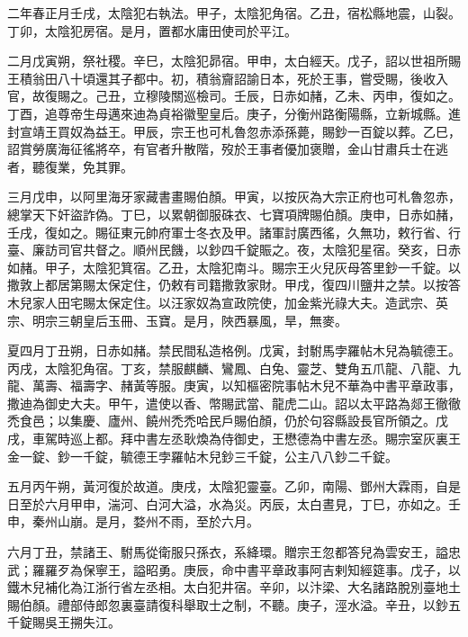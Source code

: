 
\begin{pinyinscope}

 二年春正月壬戌，太陰犯右執法。甲子，太陰犯角宿。乙丑，宿松縣地震，山裂。丁卯，太陰犯房宿。是月，置都水庸田使司於平江。



 二月戊寅朔，祭社稷。辛巳，太陰犯昴宿。甲申，太白經天。戊子，詔以世祖所賜王積翁田八十頃還其子都中。初，積翁齎詔諭日本，死於王事，嘗受賜，後收入官，故復賜之。己丑，立穆陵關巡檢司。壬辰，日赤如赭，乙未、丙申，復如之。丁酉，追尊帝生母邁來迪為貞裕徽聖皇后。庚子，分衡州路衡陽縣，立新城縣。進封宣靖王買奴為益王。甲辰，宗王也可札魯忽赤添孫薨，賜鈔一百錠以葬。乙巳，詔賞勞廣海征徭將卒，有官者升散階，歿於王事者優加褒贈，金山甘肅兵士在逃者，聽復業，免其罪。



 三月戊申，以阿里海牙家藏書畫賜伯顏。甲寅，以按灰為大宗正府也可札魯忽赤，總掌天下奸盜詐偽。丁巳，以累朝御服硃衣、七寶項牌賜伯顏。庚申，日赤如赭，壬戌，復如之。賜征東元帥府軍士冬衣及甲。諸軍討廣西徭，久無功，敕行省、行臺、廉訪司官共督之。順州民饑，以鈔四千錠賑之。夜，太陰犯星宿。癸亥，日赤如赭。甲子，太陰犯箕宿。乙丑，太陰犯南斗。賜宗王火兒灰母答里鈔一千錠。以撒敦上都居第賜太保定住，仍敕有司籍撒敦家財。甲戌，復四川鹽井之禁。以按答木兒家人田宅賜太保定住。以汪家奴為宣政院使，加金紫光祿大夫。造武宗、英宗、明宗三朝皇后玉冊、玉寶。是月，陜西暴風，旱，無麥。



 夏四月丁丑朔，日赤如赭。禁民間私造格例。戊寅，封駙馬孛羅帖木兒為毓德王。丙戌，太陰犯角宿。丁亥，禁服麒麟、鸞鳳、白兔、靈芝、雙角五爪龍、八龍、九龍、萬壽、福壽字、赭黃等服。庚寅，以知樞密院事帖木兒不華為中書平章政事，撒迪為御史大夫。甲午，遣使以香、幣賜武當、龍虎二山。詔以太平路為郯王徹徹禿食邑；以集慶、廬州、饒州禿禿哈民戶賜伯顏，仍於句容縣設長官所領之。戊戌，車駕時巡上都。拜中書左丞耿煥為侍御史，王懋德為中書左丞。賜宗室灰裏王金一錠、鈔一千錠，毓德王孛羅帖木兒鈔三千錠，公主八八鈔二千錠。



 五月丙午朔，黃河復於故道。庚戌，太陰犯靈臺。乙卯，南陽、鄧州大霖雨，自是日至於六月甲申，湍河、白河大溢，水為災。丙辰，太白晝見，丁巳，亦如之。壬申，秦州山崩。是月，婺州不雨，至於六月。



 六月丁丑，禁諸王、駙馬從衛服只孫衣，系絳環。贈宗王忽都答兒為雲安王，謚忠武；羅羅歹為保寧王，謚昭勇。庚辰，命中書平章政事阿吉剌知經筵事。戊子，以鐵木兒補化為江浙行省左丞相。太白犯井宿。辛卯，以汴梁、大名諸路脫別臺地土賜伯顏。禮部侍郎忽裏臺請復科舉取士之制，不聽。庚子，涇水溢。辛丑，以鈔五千錠賜吳王搠失江。




\end{pinyinscope}
